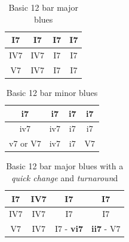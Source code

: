 \documentclass{article}
\begin{document}
\begin{table}[!h]
	\caption{Basic 12 bar major blues}
	\centering
	\begin{tabular}{| c | c | c | c |}
		\hline
		\phantom{x}I7\phantom{x} & \phantom{x}I7\phantom{x} & \phantom{x}I7\phantom{x} & \phantom{x}I7\phantom{x}  \\
		\hline
		\phantom{x}IV7\phantom{x} & \phantom{x}IV7\phantom{x} & \phantom{x}I7\phantom{x} & \phantom{x}I7\phantom{x}  \\
		\hline
		\phantom{x}V7\phantom{x} & \phantom{x}IV7\phantom{x} & \phantom{x}I7\phantom{x} & \phantom{x}I7\phantom{x}  \\
		\hline
	\end{tabular}
	\label{tab: }
\end{table}

\begin{table}[!h]
	\caption{Basic 12 bar minor blues}
	\centering
	\begin{tabular}{| c | c | c | c |}
		\hline
		\phantom{x}i7\phantom{x} & \phantom{x}i7\phantom{x} & \phantom{x}i7\phantom{x} & \phantom{x}i7\phantom{x}  \\
		\hline
		\phantom{x}iv7\phantom{x} & \phantom{x}iv7\phantom{x} & \phantom{x}i7\phantom{x} & \phantom{x}i7\phantom{x}  \\
		\hline
		\phantom{x}v7 or V7\phantom{x} & \phantom{x}iv7\phantom{x} & \phantom{x}i7\phantom{x} & \phantom{x}V7\phantom{x}  \\
		\hline
	\end{tabular}
	\label{tab: }
\end{table}

\begin{table}[!h]
	\caption{Basic 12 bar major blues with a \textit{quick change} and \textit{turnaroun}d}
	\centering
	\begin{tabular}{| c | c | c | c |}
		\hline
		\phantom{x}I7\phantom{x} & \phantom{x}\textbf{IV7}\phantom{x} & \phantom{x}I7\phantom{x} & \phantom{x}I7\phantom{x}  \\
		\hline
		\phantom{x}IV7\phantom{x} & \phantom{x}IV7\phantom{x} & \phantom{x}I7\phantom{x} & \phantom{x}I7\phantom{x}  \\
		\hline
		\phantom{x}V7\phantom{x} & \phantom{x}IV7\phantom{x} & \phantom{x}I7 - \textbf{vi7} & \textbf{ii7} - V7\phantom{x}  \\
		\hline
	\end{tabular}
	\label{tab: }
\end{table}
\end{document}
